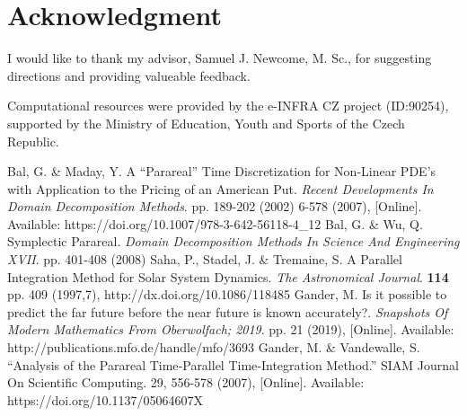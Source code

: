 \documentclass[conference]{IEEEtran}
\begin{document}
\section*{Acknowledgment}

I would like to thank my advisor, Samuel J. Newcome, M. Sc., for suggesting directions and providing valueable feedback.

Computational resources were provided by the e-INFRA CZ project (ID:90254),
supported by the Ministry of Education, Youth and Sports of the Czech Republic.

\begin{thebibliography}{00}
Bal, G. \& Maday, Y. A “Parareal” Time Discretization for Non-Linear PDE's with Application to the Pricing of an American Put. {\em Recent Developments In Domain Decomposition Methods}. pp. 189-202 (2002)
6-578 (2007), [Online]. Available: https://doi.org/10.1007/978-3-642-56118-4\_12
Bal, G. \& Wu, Q. Symplectic Parareal. {\em Domain Decomposition Methods In Science And Engineering XVII}. pp. 401-408 (2008)
Saha, P., Stadel, J. \& Tremaine, S. A Parallel Integration Method for Solar System Dynamics. {\em The Astronomical Journal}. \textbf{114} pp. 409 (1997,7), http://dx.doi.org/10.1086/118485
Gander, M. Is it possible to predict the far future before the near future is known accurately?. {\em Snapshots Of Modern Mathematics From Oberwolfach; 2019}. pp. 21 (2019), [Online]. Available: http://publications.mfo.de/handle/mfo/3693
Gander, M. \& Vandewalle, S. ``Analysis of the Parareal Time‐Parallel Time‐Integration Method.'' SIAM Journal On Scientific Computing. 29, 556-578 (2007), [Online]. Available: https://doi.org/10.1137/05064607X
\end{thebibliography}
\end{document}
